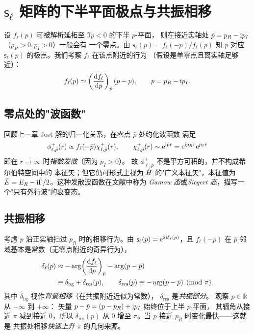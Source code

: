 \section{$\mathsf{s}_\ell$ 矩阵的下半平面极点与共振相移}

设 $f_\ell(p)$ 可被解析延拓至 $\Im p<0$ 的下半 $p$-平面，
则在接近实轴处 $\bar p=p_R-\mathrm{i} p_I$（$p_R>0,p_I>0$）一般会有
一个零点。由 $\mathsf{s}_\ell(p)=f_\ell(-p)/f_\ell(p)$ 知 $\bar p$
对应 $\mathsf{s}_\ell(p)$ 的极点。我们考察 $f_\ell$ 在该点附近的行为
（假设是单零点且离实轴足够近）：
\begin{equation}
  f_\ell(p)\simeq\left(\frac{\mathrm{d} f_\ell}{\mathrm{d} p}\right)_{\bar p}(p-\bar p)
  ,\qquad \bar p=p_R-\mathrm{i} p_I.
\end{equation}

\subsection{零点处的"波函数"}

回顾上一章 Jost 解的归一化关系，在零点 $\bar p$ 处约化波函数
满足
\begin{equation}
  \phi^+_{\ell,\bar p}(r)\propto f_\ell(-\bar p)\chi^+_{\ell,\bar p}(r),
  \qquad \chi^+_{\ell,\bar p}(r)\sim\mathrm{e}^{\mathrm{i}\bar p r}=\mathrm{e}^{\mathrm{i} p_R r}\mathrm{e}^{p_I r}
\end{equation}
即在 $r\to\infty$ 时\emph{指数发散}（因为 $p_I>0$）。
故 $\phi^+_{\ell,\bar p}$ 不是平方可积的，并不构成希尔伯特空间中的
本征矢；但它仍可形式上视为 $\hat{H}$ 的"广义本征矢"，本征值为
$\bar E=E_R-\mathrm{i}\Gamma/2$。这种发散波函数在文献中称为
\emph{Gamow 态}或\emph{Siegert 态}，描写一个"只有外行波"的衰变态。

\subsection{共振相移}

考虑 $p$ 沿正实轴扫过 $p_R$ 时的相移行为。由
$\mathsf{s}_\ell(p)=\mathrm{e}^{2\mathrm{i}\delta_\ell(p)}$，且
$f_\ell(-p)$ 在 $\bar p$ 邻域基本是常数（无零点附近的奇异行为），
\begin{align}
  \delta_\ell(p)
  &\approx -\arg\!\left(\frac{\mathrm{d} f_\ell}{\mathrm{d} p}\right)_{\bar p}-\arg(p-\bar p)\nonumber\\
  &\equiv \delta_{\mathrm{bg}}+\delta_{\mathrm{res}}(p),
  \qquad
  \delta_{\mathrm{res}}(p)\equiv -\arg(p-\bar p) \pmod\pi .
\end{align}
其中 $\delta_{\mathrm{bg}}$ 视作\emph{背景相移}（在共振附近近似为常数），
$\delta_{\mathrm{res}}$ 是\emph{共振部分}。
观察 $p\in\mathbb R$ 从 $-\infty$ 到 $+\infty$：
矢量 $p-\bar p=(p-p_R)+\mathrm{i} p_I$ 始终位于上半 $p$-平面，
其辐角从接近 $\pi$ 减到接近 $0$，所以 $\delta_{\mathrm{res}}(p)$
从 $0$ 增至 $\pi$。当 $p$ 接近 $p_R$ 时变化最快——这就是
共振处相移\emph{快速上升 $\pi$} 的几何来源。

